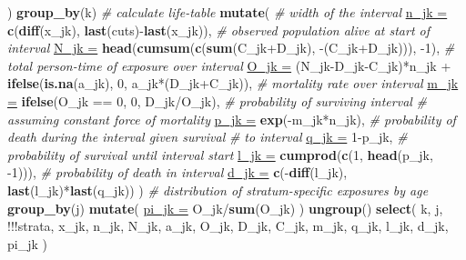 \documentclass[10pt,twoside,reqno]{article}
\newenvironment{Shaded}{}{}
\newcommand{\CommentTok}[1]{\textit{#1}}
\newcommand{\DataTypeTok}[1]{\underline{#1}}
\newcommand{\DecValTok}[1]{#1}
\newcommand{\KeywordTok}[1]{\textbf{#1}}
\newcommand{\NormalTok}[1]{#1}
\newcommand{\OperatorTok}[1]{#1}
\newcommand{\StringTok}[1]{#1}
\begin{document}
\begin{Shaded}
\begin{Highlighting}[]
{{{{{{{  \NormalTok{    ) }\OperatorTok{%
  \StringTok{    }\KeywordTok{group_by}\NormalTok{(k) }\OperatorTok{%
  \StringTok{    }\CommentTok{# calculate life-table}
  \StringTok{    }\KeywordTok{mutate}\NormalTok{(}
        \CommentTok{# width of the interval}
        \DataTypeTok{n_jk =}
          \KeywordTok{c}\NormalTok{(}\KeywordTok{diff}\NormalTok{(x_jk), }\KeywordTok{last}\NormalTok{(cuts)}\OperatorTok{-}\KeywordTok{last}\NormalTok{(x_jk)),}
        \CommentTok{# observed population alive at start of interval}
        \DataTypeTok{N_jk =}
          \KeywordTok{head}\NormalTok{(}\KeywordTok{cumsum}\NormalTok{(}\KeywordTok{c}\NormalTok{(}\KeywordTok{sum}\NormalTok{(C_jk}\OperatorTok{+}\NormalTok{D_jk), }\OperatorTok{-}\NormalTok{(C_jk}\OperatorTok{+}\NormalTok{D_jk))), }\DecValTok{-1}\NormalTok{),}
        \CommentTok{# total person-time of exposure over interval}
        \DataTypeTok{O_jk =}
  \NormalTok{        (N_jk}\OperatorTok{-}\NormalTok{D_jk}\OperatorTok{-}\NormalTok{C_jk)}\OperatorTok{*}\NormalTok{n_jk }\OperatorTok{+}
  \StringTok{        }\KeywordTok{ifelse}\NormalTok{(}\KeywordTok{is.na}\NormalTok{(a_jk), }\DecValTok{0}\NormalTok{, a_jk}\OperatorTok{*}\NormalTok{(D_jk}\OperatorTok{+}\NormalTok{C_jk)),}
        \CommentTok{# mortality rate over interval}
        \DataTypeTok{m_jk =}
          \KeywordTok{ifelse}\NormalTok{(O_jk }\OperatorTok{==}\StringTok{ }\DecValTok{0}\NormalTok{, }\DecValTok{0}\NormalTok{, D_jk}\OperatorTok{/}\NormalTok{O_jk),}
        \CommentTok{# probability of surviving interval}
        \CommentTok{# assuming constant force of mortality}
        \DataTypeTok{p_jk =}
          \KeywordTok{exp}\NormalTok{(}\OperatorTok{-}\NormalTok{m_jk}\OperatorTok{*}\NormalTok{n_jk),}
        \CommentTok{# probability of death during the interval given survival}
        \CommentTok{# to interval}
        \DataTypeTok{q_jk =}
          \DecValTok{1}\OperatorTok{-}\NormalTok{p_jk,}
        \CommentTok{# probability of survival until interval start}
        \DataTypeTok{l_jk =}
          \KeywordTok{cumprod}\NormalTok{(}\KeywordTok{c}\NormalTok{(}\DecValTok{1}\NormalTok{, }\KeywordTok{head}\NormalTok{(p_jk, }\DecValTok{-1}\NormalTok{))),}
        \CommentTok{# probability of death in interval}
        \DataTypeTok{d_jk =}
          \KeywordTok{c}\NormalTok{(}\OperatorTok{-}\KeywordTok{diff}\NormalTok{(l_jk), }\KeywordTok{last}\NormalTok{(l_jk)}\OperatorTok{*}\KeywordTok{last}\NormalTok{(q_jk))}
  \NormalTok{    ) }\OperatorTok{%
  \StringTok{    }\CommentTok{# distribution of stratum-specific exposures by age}
  \StringTok{    }\KeywordTok{group_by}\NormalTok{(j) }\OperatorTok{%
  \StringTok{    }\KeywordTok{mutate}\NormalTok{(}
        \DataTypeTok{pi_jk =}\NormalTok{ O_jk}\OperatorTok{/}\KeywordTok{sum}\NormalTok{(O_jk)}
  \NormalTok{    ) }\OperatorTok{%
  \StringTok{    }\KeywordTok{ungroup}\NormalTok{() }\OperatorTok{%
  \StringTok{    }\KeywordTok{select}\NormalTok{(}
  \NormalTok{      k, j, }\OperatorTok{!!!}\NormalTok{strata, x_jk, n_jk, N_jk, a_jk, O_jk, D_jk, C_jk,}
  \NormalTok{      m_jk, q_jk, l_jk, d_jk, pi_jk}
  \NormalTok{    )}
  
}}}}}}}}}}}}}
\end{Highlighting}
\end{Shaded}
\end{document}
